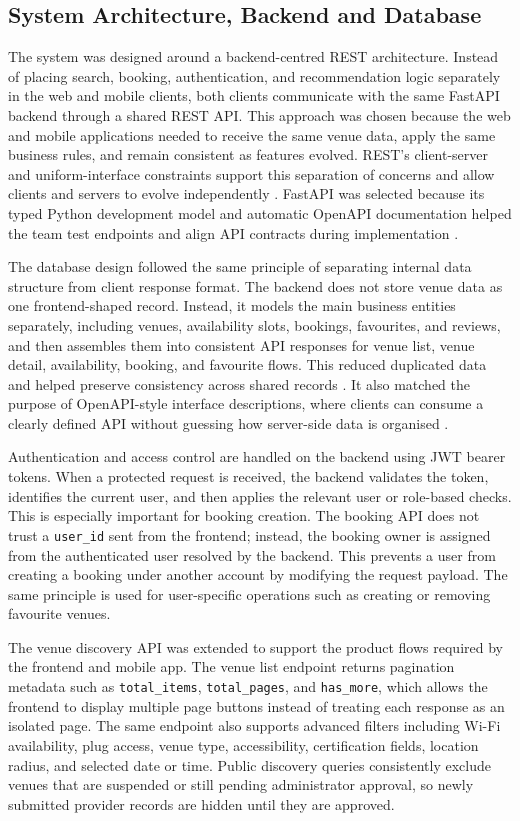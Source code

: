 ﻿\documentclass[conference,a4paper]{IEEEtran}
\begin{document}
\subsection{System Architecture, Backend and Database}
The system was designed around a backend-centred REST architecture. Instead of placing search, booking, authentication, and recommendation logic separately in the web and mobile clients, both clients communicate with the same FastAPI backend through a shared REST API. This approach was chosen because the web and mobile applications needed to receive the same venue data, apply the same business rules, and remain consistent as features evolved. REST's client-server and uniform-interface constraints support this separation of concerns and allow clients and servers to evolve independently \cite{fielding2000rest}. FastAPI was selected because its typed Python development model and automatic OpenAPI documentation helped the team test endpoints and align API contracts during implementation \cite{fastapi_docs}.

The database design followed the same principle of separating internal data structure from client response format. The backend does not store venue data as one frontend-shaped record. Instead, it models the main business entities separately, including venues, availability slots, bookings, favourites, and reviews, and then assembles them into consistent API responses for venue list, venue detail, availability, booking, and favourite flows. This reduced duplicated data and helped preserve consistency across shared records \cite{codd1970relational}. It also matched the purpose of OpenAPI-style interface descriptions, where clients can consume a clearly defined API without guessing how server-side data is organised \cite{openapi_spec}.

Authentication and access control are handled on the backend using JWT bearer tokens. When a protected request is received, the backend validates the token, identifies the current user, and then applies the relevant user or role-based checks. This is especially important for booking creation. The booking API does not trust a \texttt{user\_id} sent from the frontend; instead, the booking owner is assigned from the authenticated user resolved by the backend. This prevents a user from creating a booking under another account by modifying the request payload. The same principle is used for user-specific operations such as creating or removing favourite venues.

The venue discovery API was extended to support the product flows required by the frontend and mobile app. The venue list endpoint returns pagination metadata such as \texttt{total\_items}, \texttt{total\_pages}, and \texttt{has\_more}, which allows the frontend to display multiple page buttons instead of treating each response as an isolated page. The same endpoint also supports advanced filters including Wi-Fi availability, plug access, venue type, accessibility, certification fields, location radius, and selected date or time. Public discovery queries consistently exclude venues that are suspended or still pending administrator approval, so newly submitted provider records are hidden until they are approved.
\end{document}
